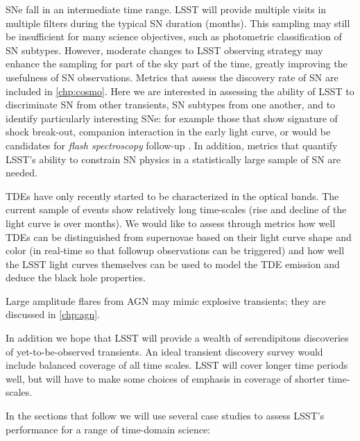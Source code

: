 SNe fall in an intermediate time range.  LSST will provide
multiple visits in multiple filters during the typical SN duration
(months).  This sampling may still be insufficient for many science
objectives, such as photometric classification of SN subtypes.
However, moderate changes to LSST
observing strategy may enhance the sampling for part of the sky part
of the time, greatly improving the usefulness of SN observations.
Metrics that assess the discovery rate of SN are included in
\autoref{chp:cosmo}.
Here we are interested in assessing the ability of
LSST to discriminate SN from other transients, SN subtypes from one
another, and to identify particularly interesting SNe: for example
those that show signature of shock break-out, companion interaction
in the early light curve, or would be candidates for \emph{flash
spectroscopy} follow-up \citep[e.g.,][]{2014Natur.509..471G}.
In addition, metrics that
quantify LSST's ability to constrain SN physics in a statistically
large sample of SN are needed.

TDEs have only recently started to be characterized in the optical
bands. The current sample of events show relatively long
time-scales (rise and decline of the light curve is over months). We
would like to assess through metrics how well TDEs can be
distinguished from supernovae based on their light curve shape and
color (in real-time so that followup observations can be triggered)
and how well the LSST light curves themselves can be used to model the
TDE emission and deduce the black hole properties.

Large amplitude flares from AGN may mimic
explosive transients; they are discussed in \autoref{chp:agn}.

In addition we hope that LSST will provide a wealth of serendipitous
discoveries of yet-to-be-observed transients.  An ideal transient
discovery survey would include balanced coverage of all time scales. LSST
will cover longer time periods well, but will have to make some
choices of emphasis in coverage of shorter time-scales.

In the sections that follow we will use several case studies to assess
LSST's performance for a range of time-domain science:

